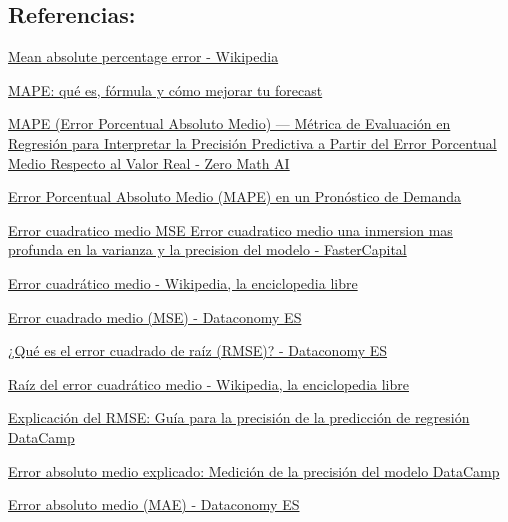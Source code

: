 \documentclass[]{article}
\begin{document}
\subsection{Referencias:}\label{referencias-3}

\href{https://en.wikipedia.org/wiki/Mean_absolute_percentage_error}{Mean
absolute percentage error - Wikipedia}

\href{https://imperiascm.com/es-es/blog/mape-prevision-demanda}{MAPE:
qué es, fórmula y cómo mejorar tu forecast}

\href{https://zeromathai.com/es/mape-es/}{MAPE (Error Porcentual
Absoluto Medio) --- Métrica de Evaluación en Regresión para Interpretar
la Precisión Predictiva a Partir del Error Porcentual Medio Respecto al
Valor Real - Zero Math AI}

\href{https://gestiondeoperaciones.net/proyeccion-de-demanda/error-porcentual-absoluto-medio-mape-en-un-pronostico-de-demanda/}{Error
Porcentual Absoluto Medio (MAPE) en un Pronóstico de Demanda}

\href{https://fastercapital.com/es/contenido/Error-cuadratico-medio--MSE--Error-cuadratico-medio--una-inmersion-mas-profunda-en-la-varianza-y-la-precision-del-modelo.html}{Error
cuadratico medio MSE Error cuadratico medio una inmersion mas profunda
en la varianza y la precision del modelo - FasterCapital}

\href{https://es.wikipedia.org/wiki/Error_cuadr\%C3\%A1tico_medio}{Error
cuadrático medio - Wikipedia, la enciclopedia libre}

\href{https://es.dataconomy.com/2025/05/08/error-cuadrado-medio-mse/}{Error
cuadrado medio (MSE) - Dataconomy ES}

\href{https://es.dataconomy.com/2025/04/03/que-es-el-error-cuadrado-de-raiz-rmse/}{¿Qué
es el error cuadrado de raíz (RMSE)? - Dataconomy ES}

\href{https://es.wikipedia.org/wiki/Ra\%C3\%ADz_del_error_cuadr\%C3\%A1tico_medio}{Raíz
del error cuadrático medio - Wikipedia, la enciclopedia libre}

\href{https://www.datacamp.com/es/tutorial/rmse}{Explicación del RMSE:
Guía para la precisión de la predicción de regresión \textbar{}
DataCamp}

\href{https://www.datacamp.com/es/tutorial/mean-absolute-error}{Error
absoluto medio explicado: Medición de la precisión del modelo \textbar{}
DataCamp}

\href{https://es.dataconomy.com/2025/03/28/error-absoluto-medio-mae/}{Error
absoluto medio (MAE) - Dataconomy ES}
\end{document}

